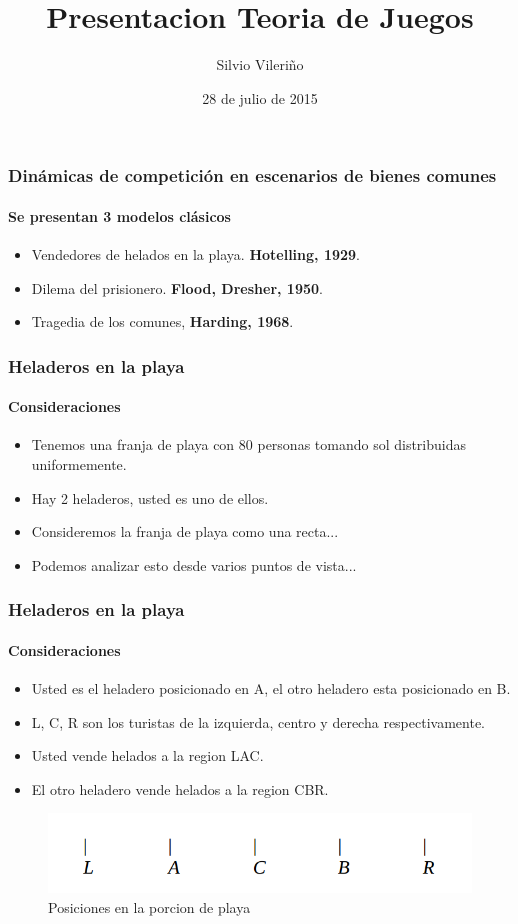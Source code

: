 \documentclass{beamer}
\title{Presentacion Teoria de Juegos}
\author{Silvio Vileriño}
\date{28 de julio de 2015}
\begin{document}
\begin{frame}
  \maketitle
\end{frame}

\begin{frame}
  \frametitle{Din\'amicas de competici\'on en escenarios de bienes comunes}
  \framesubtitle{Se presentan 3 modelos cl\'asicos}
  \begin{itemize}
    \setlength{\itemsep}{4pt}
    \item Vendedores de helados en la playa. \textbf{Hotelling, 1929}.
    \pause
    \item Dilema del prisionero. \textbf{Flood, Dresher, 1950}.
    \pause
    \item Tragedia de los comunes, \textbf{Harding, 1968}.
  \end{itemize}
\end{frame}

\begin{frame}
  \frametitle{Heladeros en la playa}
  \framesubtitle{Consideraciones}
  \begin{itemize}
    \setlength{\itemsep}{4pt}
    \item Tenemos una franja de playa con 80 personas tomando sol distribuidas uniformemente.    
    \pause
    \item Hay 2 heladeros, usted es uno de ellos.
    \pause
    \item Consideremos la franja de playa como una recta...
    \pause
    \item Podemos analizar esto desde varios puntos de vista...
  \end{itemize}
\end{frame}

\begin{frame}
  \frametitle{Heladeros en la playa}
  \framesubtitle{Consideraciones}

  \begin{itemize}
    \setlength{\itemsep}{4pt}
    \item Usted es el heladero posicionado en A, el otro heladero esta posicionado en B.
    \pause
    \item L, C, R son los turistas de la izquierda, centro y derecha respectivamente.
    \pause
    \item Usted vende helados a la region LAC.
    \pause
    \item El otro heladero vende helados a la region CBR.
    \pause
  \end{itemize}

  \begin{figure}[h!]
      \centering        
      \includegraphics[scale=0.25]{fig/playa-posiciones.png}
      \caption{Posiciones en la porcion de playa}
  \end{figure}
\end{frame}
\end{document}
